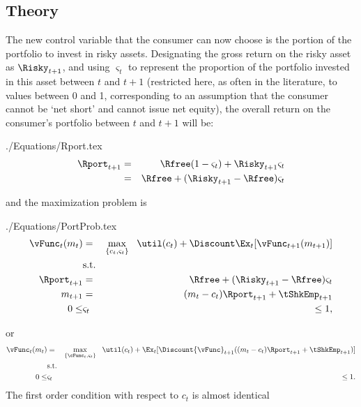 \documentclass[titlepage]{\econtex}
\begin{document}
\subsection{Theory}
The new control variable that the consumer can now choose
is the portion of the portfolio to invest in risky assets.
Designating the gross return on the risky asset
as $\Risky_{t+1}$, and using $\varsigma_{t}$ to represent the
proportion of the portfolio invested in this asset between $t$ and $t+1$
(restricted here, as often in the literature, to values between 0 and
1, corresponding to an assumption that the consumer cannot be `net
short' and cannot issue net equity), the overall return on
the consumer's portfolio between $t$ and $t+1$ will be:
\begin{verbatimwrite}{./Equations/Rport.tex}
\begin{eqnarray}
        \Rport_{t+1} & = & \Rfree(1-\varsigma_{t}) + \Risky_{t+1}\varsigma_{t} \label{eq:return1}
\\              & = & \Rfree + (\Risky_{t+1}-\Rfree) \varsigma_{t} \label{eq:return2}
\end{eqnarray}
\end{verbatimwrite}

and the maximization problem is
\begin{verbatimwrite}{./Equations/PortProb.tex}
\begin{eqnarray*}
        {\vFunc}_{t}({m}_{t}) & = & \max_{\{{c}_{t},\varsigma_{t}\}}   ~~ \util({c}_{t}) +  \Discount
        \Ex_{t}[{\vFunc}_{t+1}({m}_{t+1})]
\\      & \text{s.t.} & \nonumber
\\      \Rport_{t+1} & = & \Rfree + (\Risky_{t+1}-\Rfree) \varsigma_{t}
\\      {m}_{t+1} & = & ({m}_{t}-{c}_{t})\Rport_{t+1} + \tShkEmp_{t+1}
\\  0       \leq & \varsigma_{t} & \leq 1, \label{eq:noshorts}
\end{eqnarray*}
\end{verbatimwrite}

or
\begin{eqnarray*}
        {\vFunc}_{t}({m}_{t}) & = & \max_{\{\cFunc_{t},\varsigma_{t}\}} ~~  \util({c}_{t}) +  \Ex_{t}[\Discount {\vFunc}_{t+1}(({m}_{t}-{c}_{t}){\Rport}_{t+1} +        {\tShkEmp}_{t+1})]
\\                       & \text{s.t.} & \nonumber
\\ 0 \leq & \varsigma_{t} & \leq 1
.
\end{eqnarray*}
The first order condition with respect to ${c}_{t}$ is almost identical
\end{document}
